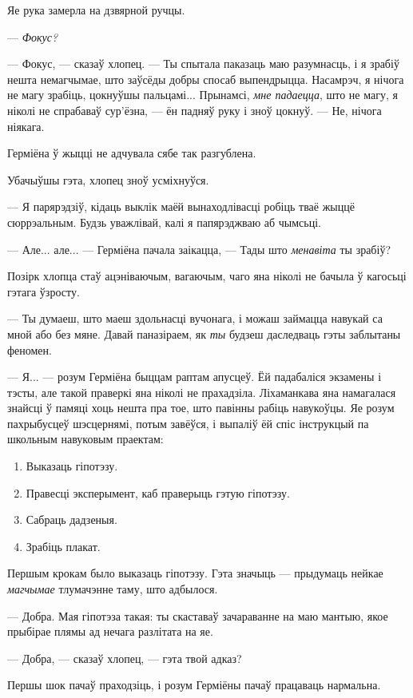 Яе рука замерла на дзвярной ручцы.

--- \emph{Фокус?}

--- Фокус, --- сказаў хлопец. --- Ты спытала паказаць маю разумнасць, і я зрабіў
нешта немагчымае, што заўсёды добры спосаб выпендрыцца. Насамрэч, я нічога не магу
зрабіць, цокнуўшы пальцамі... Прынамсі, \emph{мне падаецца}, што не магу, я ніколі
не спрабаваў сур'ёзна, --- ён падняў руку і зноў цокнуў. --- Не, нічога ніякага.

Герміёна ў жыцці не адчувала сябе так разгублена. 

Убачыўшы гэта, хлопец зноў усміхнуўся. 

--- Я парярэдзіў, кідаць выклік маёй вынаходлівасці робіць тваё жыццё сюррэальным.
Будзь уважлівай, калі я папярэджваю аб чымсьці.

--- Але... але... --- Герміёна пачала заікацца, --- Тады што \emph{менавіта} ты зрабіў?

Позірк хлопца стаў ацэніваючым, вагаючым, чаго яна ніколі не бачыла ў 
кагосьці гэтага ўзросту. 

--- Ты думаеш, што маеш здольнасці вучонага, і можаш займацца навукай 
са мной або без мяне. Давай паназіраем, як \emph{ты} будзеш даследваць гэты 
заблытаны феномен.

--- Я... --- розум Герміёна быццам раптам апусцеў. Ёй падабаліся экзамены і тэсты, 
але такой праверкі яна ніколі не прахадзіла. Ліхаманкава яна намагалася знайсці 
ў памяці хоць нешта пра тое, што павінны рабіць навукоўцы. Яе розум пахрыбусцеў
шэсцернямі, потым завёўся, і выпаліў ёй спіс інструкцый па школьным навуковым праектам:

\begin{enumerate}[Крок 1:]\firmlist
\item Выказаць гіпотэзу.
\item Правесці эксперымент, каб праверыць гэтую гіпотэзу.
\item Сабраць дадзеныя.
\item Зрабіць плакат.
\end{enumerate}


Першым крокам было выказаць гіпотэзу. Гэта значыць --- прыдумаць нейкае \emph{магчымае}  
тлумачэнне таму, што адбылося. 

--- Добра. Мая гіпотэза такая: ты скаставаў зачараванне на маю мантыю, якое
прыбірае плямы ад нечага разлітата на яе.

--- Добра, --- сказаў хлопец, --- гэта твой адказ?

Першы шок пачаў праходзіць, і розум Герміёны пачаў працаваць нармальна. 

